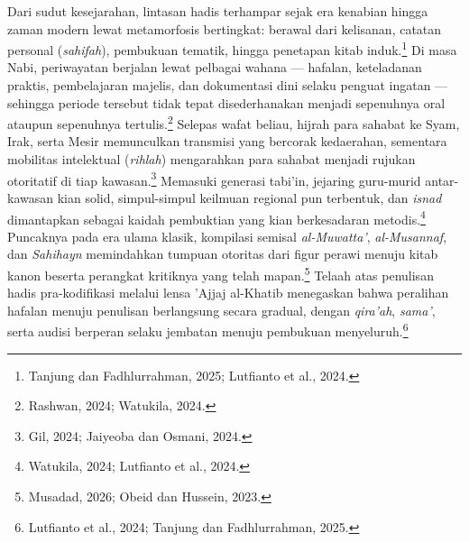 Dari sudut kesejarahan, lintasan hadis terhampar sejak era kenabian hingga zaman modern lewat metamorfosis bertingkat: berawal dari kelisanan, catatan personal (\textit{sahifah}), pembukuan tematik, hingga penetapan kitab induk.\footnote{Tanjung dan Fadhlurrahman, 2025; Lutfianto et al., 2024.} Di masa Nabi, periwayatan berjalan lewat pelbagai wahana --- hafalan, keteladanan praktis, pembelajaran majelis, dan dokumentasi dini selaku penguat ingatan --- sehingga periode tersebut tidak tepat disederhanakan menjadi sepenuhnya oral ataupun sepenuhnya tertulis.\footnote{Rashwan, 2024; Watukila, 2024.} Selepas wafat beliau, hijrah para sahabat ke Syam, Irak, serta Mesir memunculkan transmisi yang bercorak kedaerahan, sementara mobilitas intelektual (\textit{rihlah}) mengarahkan para sahabat menjadi rujukan otoritatif di tiap kawasan.\footnote{Gil, 2024; Jaiyeoba dan Osmani, 2024.} Memasuki generasi tabi'in, jejaring guru-murid antar-kawasan kian solid, simpul-simpul keilmuan regional pun terbentuk, dan \textit{isnad} dimantapkan sebagai kaidah pembuktian yang kian berkesadaran metodis.\footnote{Watukila, 2024; Lutfianto et al., 2024.} Puncaknya pada era ulama klasik, kompilasi semisal \textit{al-Muwatta'}, \textit{al-Musannaf}, dan \textit{Sahihayn} memindahkan tumpuan otoritas dari figur perawi menuju kitab kanon beserta perangkat kritiknya yang telah mapan.\footnote{Musadad, 2026; Obeid dan Hussein, 2023.} Telaah atas penulisan hadis pra-kodifikasi melalui lensa 'Ajjaj al-Khatib menegaskan bahwa peralihan hafalan menuju penulisan berlangsung secara gradual, dengan \textit{qira'ah}, \textit{sama'}, serta audisi berperan selaku jembatan menuju pembukuan menyeluruh.\footnote{Lutfianto et al., 2024; Tanjung dan Fadhlurrahman, 2025.}

